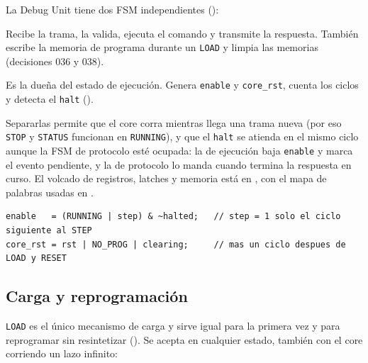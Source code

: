 La Debug Unit tiene dos FSM independientes ():

\begin{description}[style=nextline,nosep,leftmargin=1.2em]
  \item[FSM de protocolo (\repo{rtl/debug/debug_unit.v})] Recibe la trama, la valida, ejecuta el
        comando y transmite la respuesta. También escribe la memoria de programa durante un
        \texttt{LOAD} y limpia las memorias (decisiones 036 y 038).
  \item[FSM de ejecución (\repo{rtl/debug/debug_exec.v})] Es la dueña del estado de ejecución.
        Genera \texttt{enable} y \texttt{core\_rst}, cuenta los ciclos y detecta el
        \texttt{halt} ().
\end{description}

Separarlas permite que el core corra mientras llega una trama nueva (por eso \texttt{STOP} y
\texttt{STATUS} funcionan en \texttt{RUNNING}), y que el \texttt{halt} se atienda en el mismo ciclo
aunque la FSM de protocolo esté ocupada: la de ejecución baja \texttt{enable} y marca el evento
pendiente, y la de protocolo lo manda cuando termina la respuesta en curso. El volcado de
registros, latches y memoria está en , con el mapa de palabras
usadas en .

\begin{lstlisting}[style=verilog,numbers=none]
enable   = (RUNNING | step) & ~halted;   // step = 1 solo el ciclo siguiente al STEP
core_rst = rst | NO_PROG | clearing;     // mas un ciclo despues de LOAD y RESET
\end{lstlisting}


\subsection{Carga y reprogramación}

\texttt{LOAD} es el único mecanismo de carga y sirve igual para la primera vez y para reprogramar
sin resintetizar (). Se acepta en cualquier estado, también con el core corriendo un
lazo infinito:

